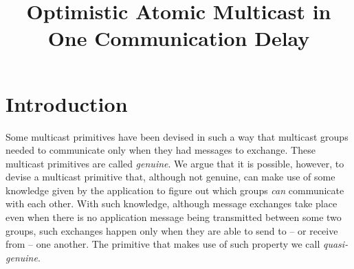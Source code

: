 \documentclass[times, 10pt]{article}
\begin{document}
\newcommand{\mv}[1]{\ensuremath{\operatorname{\mathit{#1}}}}
\newcommand{\bc}[1]{\textcolor{dark}{#1}}
\newtheorem{lems}{Lemma}
\newtheorem{props}{Proposition}
\newtheorem{thms}{Theorem}
\newtheorem{defs}{Definition}
\newtheorem{obs}{Observation}

\newcommand{\code}[1]{\texttt{\small{\textbf{#1}}}}

\newcommand{\blankline}{\vspace{4 mm}}
\newcommand{\amcast}{\mbox{multicast}}
\newcommand{\amdel}{\mbox{deliver}}
\newcommand{\amdelarg}[1]{\mbox{\amdel({#1})}}
\newcommand{\amcastarg}[1]{\mbox{\amcast({#1})}}
\newcommand{\tconsm}{T_{cons}}
\newcommand{\tcons}{\mbox{$\tconsm$}}
\newcommand{\opt}{\mbox{opt-deliver}}
\newcommand{\cons}{\mbox{deliver}}
\newcommand{\rmcast}{\mbox{r-mcast}}
\newcommand{\rmdel}{\mbox{r-deliver}}
\newcommand{\optdel}[1]{\mbox{\opt({#1})}}
\newcommand{\consdel}[1]{\mbox{\cons({#1})}}
\newcommand{\rmcastarg}[2]{\mbox{\rmcast({#1},{#2})}}
\newcommand{\rmdelarg}[1]{\mbox{\rmdel({#1})}}

\NewDocumentCommand {}
{\IfNoValueTF{#1}{\amcast}{\amcastarg{#1}}}

\title{Optimistic Atomic Multicast in One Communication Delay}


\maketitle

\begin{abstract}


\end{abstract}

\section{Introduction}
\label{sec:intro}

Some multicast primitives have been devised in such a way that multicast groups needed to communicate only when they had messages to exchange. These multicast primitives are called \emph{genuine}. We argue that it is possible, however, to devise a multicast primitive that, although not genuine, can make use of some knowledge given by the application to figure out which groups \emph{can} communicate with each other. With such knowledge, although message exchanges take place even when there is no application message being transmitted between some two groups, such exchanges happen only when they are able to send to -- or receive from -- one another. The primitive that makes use of such property we call \emph{quasi-genuine}. 
\end{document}
